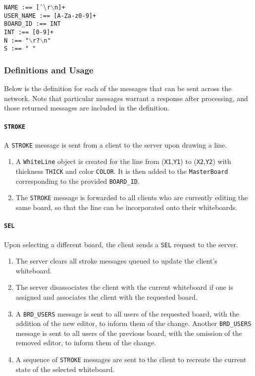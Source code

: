 \texttt{NAME :== [$\char`\^ \backslash$r$\backslash$n]+}\\
\texttt{USER\_NAME :== [A-Za-z0-9]+}\\
\texttt{BOARD\_ID :== INT}\\

\texttt{INT :== [0-9]+}\\
\texttt{N :== "$\backslash$r?$\backslash$n"}\\
\texttt{S :== " "}\\

\setlength{\parindent}{15pt} %

\subsubsection{Definitions and Usage}
Below is the definition for each of the messages that can be sent across the network. Note that particular messages warrant a response after processing, and those returned messages are included in the definition.

\paragraph{\texttt{STROKE}} A \texttt{STROKE} message is sent from a client to the server upon drawing a line.
\begin{enumerate}
\item A \texttt{WhiteLine} object is created for the line from (\texttt{X1},\texttt{Y1}) to (\texttt{X2},\texttt{Y2}) with thickness \texttt{THICK} and color \texttt{COLOR}. It is then added to the \texttt{MasterBoard} corresponding to the provided \texttt{BOARD\_ID}.
\item The \texttt{STROKE} message is forwarded to all clients who are currently editing the same board, so that the line can be incorporated onto their whiteboards.
\end{enumerate}

\paragraph{\texttt{SEL}} Upon selecting a different board, the client sends a \texttt{SEL} request to the server.
\begin{enumerate}
\item The server clears all stroke messages queued to update the client's whiteboard.
\item The server disassociates the client with the current whiteboard if one is assigned and associates the client with the requested board.
\item A \texttt{BRD\_USERS} message is sent to all users of the requested board, with the addition of the new editor, to inform them of the change. Another \texttt{BRD\_USERS} message is sent to all users of the previous board, with the omission of the removed editor, to inform them of the change.
\item A sequence of \texttt{STROKE} messages are sent to the client to recreate the current state of the selected whiteboard.
\end{enumerate}

